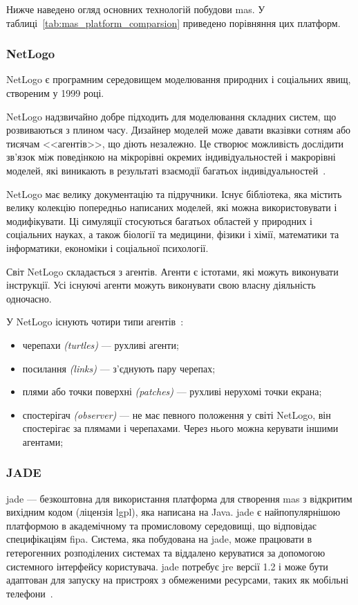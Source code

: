 Нижче наведено огляд основних технологій побудови \acrshort{mas}. 
У таблиці~\ref{tab:mas_platform_comparsion} приведено порівняння цих платформ.

\subsubsection{NetLogo}
NetLogo є програмним середовищем моделювання природних і соціальних явищ, створеним у 1999 році.

NetLogo надзвичайно добре підходить для моделювання складних систем, що розвиваються з плином часу. 
Дизайнер моделей може давати вказівки сотням або тисячам <<агентів>>, що діють незалежно. 
Це створює можливість дослідити зв'язок між поведінкою на мікрорівні окремих індивідуальностей і макрорівні моделей, які виникають в результаті взаємодії багатьох індивідуальностей~\cite{Glybovets2013}.

NetLogo має велику документацію та підручники. 
Існує бібліотека, яка містить велику колекцію попередньо написаних моделей, які можна використовувати і модифікувати. 
Ці симуляції стосуються багатьох областей у природних і соціальних науках, а також біології та медицини, фізики і хімії, математики та інформатики, економіки і соціальної психології.

Світ NetLogo складається з агентів. 
Агенти є істотами, які можуть виконувати інструкції. Усі існуючі агенти можуть виконувати свою власну діяльність одночасно.

У NetLogo існують чотири типи агентів~\cite{Glybovets2013}:
\begin{itemize}
	\item черепахи \textit{(turtles)} --- рухливі агенти; 
	\item посилання \textit{(links)} --- з'єднують пару черепах; 
	\item плями або точки поверхні \textit{(patches)} --- рухливі нерухомі точки екрана; 
	\item спостерігач \textit{(observer)} --- не має певного положення у світі NetLogo, він спостерігає за плямами і черепахами. 
	Через нього можна керувати іншими агентами; 
\end{itemize}

\subsubsection{JADE}
\acrshort{jade} --- безкоштовна для використання платформа для створення \acrshort{mas} з відкритим вихідним кодом (ліцензія \acrshort{lgpl}), яка написана на Java.
\acrshort{jade} є найпопулярнішою платформою в академічному та промисловому середовищі, що відповідає специфікаціям \acrshort{fipa}.
Система, яка побудована на \acrshort{jade}, може працювати в гетерогенних розподілених системах та віддалено керуватися за допомогою системного інтерфейсу користувача.
\acrshort{jade} потребує \acrshort{jre} версії 1.2 і може бути адаптован для запуску на пристроях з обмеженими ресурсами, таких як мобільні телефони~\cite{Kravari2015}.

